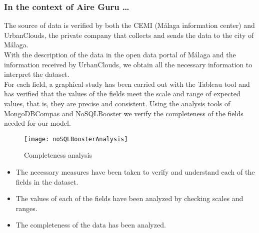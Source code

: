 \subsubsection*{In the context of Aire Guru \ldots} 

The source of data is verified by both the CEMI (Málaga information center) and UrbanClouds, the private company
that collects and sends the data to the city of Málaga. \\

With the description of the data in the open data portal of Málaga and the information received by UrbanClouds,
we obtain all the necessary information to interpret the dataset. \\

For each field, a graphical study has been carried out with the Tableau tool and has verified that the values of the
fields meet the scale and range of expected values, that is, they are precise and consistent.
Using the analysis tools of MongoDBCompas and NoSQLBooster we verify the completeness of the fields needed for our model.

\begin{figure}[ht]
    \centering
    \texttt{[image: noSQLBoosterAnalysis]}
    \caption{Completeness analysis}
\end{figure}

\begin{itemize}
    \item The necessary measures have been taken to verify and understand each of the fields in the dataset.
    \item The values of each of the fields have been analyzed by checking scales and ranges.
    \item The completeness of the data has been analyzed.
\end{itemize}